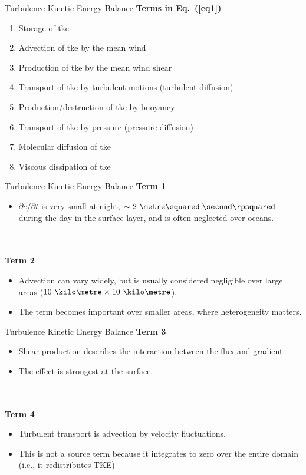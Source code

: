 \begin{frame}{Turbulence Kinetic Energy Balance}
\textbf{\underline{Terms in Eq.~(\ref{eq1})}}
\begin{enumerate}
	\item Storage of tke
	\item Advection of tke by the mean wind
	\item Production of tke by the mean wind shear
	\item Transport of tke by turbulent motions (turbulent diffusion)
	\item Production/destruction of tke by buoyancy
	\item Transport of tke by pressure (pressure diffusion)
	\item Molecular diffusion of tke
	\item Viscous dissipation of tke
\end{enumerate}
\end{frame}
\begin{frame}{Turbulence Kinetic Energy Balance}
\textbf{Term 1}
\begin{itemize}
	\item $\partial \overline{e}/\partial t$ is very small at night, $\sim 2\ \metre\squared\; \second\rpsquared$ during the day in the surface layer, and is often neglected over oceans.
\end{itemize}
~\\~\\
\textbf{Term 2}
\begin{itemize}
	\item Advection can vary widely, but is usually considered negligible over large areas ($10\ \kilo\metre \times 10\ \kilo\metre$).
	\item The term becomes important over smaller areas, where heterogeneity matters.
\end{itemize}
\end{frame}
\begin{frame}{Turbulence Kinetic Energy Balance}
\textbf{Term 3}
\begin{itemize}
	\item Shear production describes the interaction between the flux and gradient.
	\item The effect is strongest at the surface.
\end{itemize}
~\\~\\
\textbf{Term 4}
\begin{itemize}
	\item Turbulent transport is advection by velocity fluctuations.
	\item This is not a source term because it integrates to zero over the entire domain (i.e., it redistributes TKE)
\end{itemize}
\end{frame}
